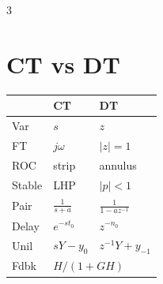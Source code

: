 \documentclass[11pt]{extarticle}
\newcommand{\rtable}[1]{\noindent\hfill#1}
\begin{document}
\begin{paracol}{3}
\vspace{6pt}
\rtable{%
\begin{minipage}[t]{\columnwidth}
\section*{\hfill CT vs DT}
\hfill\begin{tabular}{@{}l l l@{}}
\toprule
 & CT & DT \\
\midrule
Var & $s$ & $z$ \\
FT & $j\omega$ & $|z|{=}1$ \\
ROC & strip & annulus \\
Stable & LHP & $|p|{<}1$ \\
Pair & $\tfrac{1}{s+a}$ & $\tfrac{1}{1-az^{-1}}$ \\
Delay & $e^{-st_0}$ & $z^{-n_0}$ \\
Unil & $sY{-}y_0$ & $z^{-1}Y{+}y_{-1}$ \\
Fdbk & \multicolumn{2}{l}{$H/(1{+}GH)$} \\
\bottomrule
\end{tabular}
\end{minipage}
}

\end{paracol}
\end{document}
